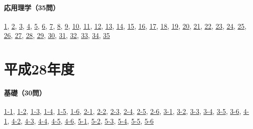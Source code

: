 \paragraph{応用理学（35問）} \hyperref[q:h27-reg-applied-01]{1}, \hyperref[q:h27-reg-applied-02]{2}, \hyperref[q:h27-reg-applied-03]{3}, \hyperref[q:h27-reg-applied-04]{4}, \hyperref[q:h27-reg-applied-05]{5}, \hyperref[q:h27-reg-applied-06]{6}, \hyperref[q:h27-reg-applied-07]{7}, \hyperref[q:h27-reg-applied-08]{8}, \hyperref[q:h27-reg-applied-09]{9}, \hyperref[q:h27-reg-applied-10]{10}, \hyperref[q:h27-reg-applied-11]{11}, \hyperref[q:h27-reg-applied-12]{12}, \hyperref[q:h27-reg-applied-13]{13}, \hyperref[q:h27-reg-applied-14]{14}, \hyperref[q:h27-reg-applied-15]{15}, \hyperref[q:h27-reg-applied-16]{16}, \hyperref[q:h27-reg-applied-17]{17}, \hyperref[q:h27-reg-applied-18]{18}, \hyperref[q:h27-reg-applied-19]{19}, \hyperref[q:h27-reg-applied-20]{20}, \hyperref[q:h27-reg-applied-21]{21}, \hyperref[q:h27-reg-applied-22]{22}, \hyperref[q:h27-reg-applied-23]{23}, \hyperref[q:h27-reg-applied-24]{24}, \hyperref[q:h27-reg-applied-25]{25}, \hyperref[q:h27-reg-applied-26]{26}, \hyperref[q:h27-reg-applied-27]{27}, \hyperref[q:h27-reg-applied-28]{28}, \hyperref[q:h27-reg-applied-29]{29}, \hyperref[q:h27-reg-applied-30]{30}, \hyperref[q:h27-reg-applied-31]{31}, \hyperref[q:h27-reg-applied-32]{32}, \hyperref[q:h27-reg-applied-33]{33}, \hyperref[q:h27-reg-applied-34]{34}, \hyperref[q:h27-reg-applied-35]{35}
\section{平成28年度}
\paragraph{基礎（30問）} \hyperref[q:h28-reg-basic-1-1]{1-1}, \hyperref[q:h28-reg-basic-1-2]{1-2}, \hyperref[q:h28-reg-basic-1-3]{1-3}, \hyperref[q:h28-reg-basic-1-4]{1-4}, \hyperref[q:h28-reg-basic-1-5]{1-5}, \hyperref[q:h28-reg-basic-1-6]{1-6}, \hyperref[q:h28-reg-basic-2-1]{2-1}, \hyperref[q:h28-reg-basic-2-2]{2-2}, \hyperref[q:h28-reg-basic-2-3]{2-3}, \hyperref[q:h28-reg-basic-2-4]{2-4}, \hyperref[q:h28-reg-basic-2-5]{2-5}, \hyperref[q:h28-reg-basic-2-6]{2-6}, \hyperref[q:h28-reg-basic-3-1]{3-1}, \hyperref[q:h28-reg-basic-3-2]{3-2}, \hyperref[q:h28-reg-basic-3-3]{3-3}, \hyperref[q:h28-reg-basic-3-4]{3-4}, \hyperref[q:h28-reg-basic-3-5]{3-5}, \hyperref[q:h28-reg-basic-3-6]{3-6}, \hyperref[q:h28-reg-basic-4-1]{4-1}, \hyperref[q:h28-reg-basic-4-2]{4-2}, \hyperref[q:h28-reg-basic-4-3]{4-3}, \hyperref[q:h28-reg-basic-4-4]{4-4}, \hyperref[q:h28-reg-basic-4-5]{4-5}, \hyperref[q:h28-reg-basic-4-6]{4-6}, \hyperref[q:h28-reg-basic-5-1]{5-1}, \hyperref[q:h28-reg-basic-5-2]{5-2}, \hyperref[q:h28-reg-basic-5-3]{5-3}, \hyperref[q:h28-reg-basic-5-4]{5-4}, \hyperref[q:h28-reg-basic-5-5]{5-5}, \hyperref[q:h28-reg-basic-5-6]{5-6}
